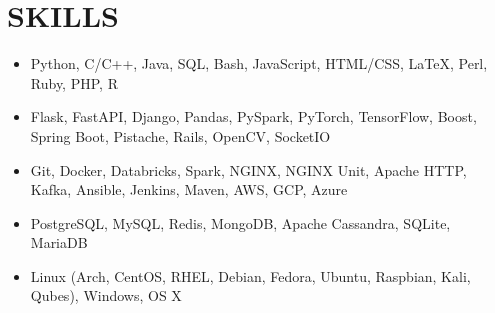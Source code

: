 \documentclass[11pt,letterpaper]{article}
\begin{document}







  \section*{SKILLS}

  \begin{itemize}
    \item{
      {}
      Python, C/C++, Java, SQL, Bash, JavaScript, HTML/CSS, \LaTeX, Perl, Ruby, PHP, R
    }

    \item{
      {}
      Flask, FastAPI, Django, Pandas, PySpark, PyTorch, TensorFlow, Boost, Spring Boot, Pistache, Rails, OpenCV, SocketIO%
    }

    \item{
      {}
      Git, Docker, Databricks, Spark, NGINX, NGINX Unit, Apache HTTP, Kafka, Ansible, Jenkins, Maven, AWS, GCP, Azure
    }

    \item{
      {}
      PostgreSQL, MySQL, Redis, MongoDB, Apache Cassandra, SQLite, MariaDB
    }


    \item{
      {}
      Linux (Arch, CentOS, RHEL, Debian, Fedora, Ubuntu, Raspbian, Kali, Qubes), Windows, OS X
    }
  \end{itemize}
\end{document}
